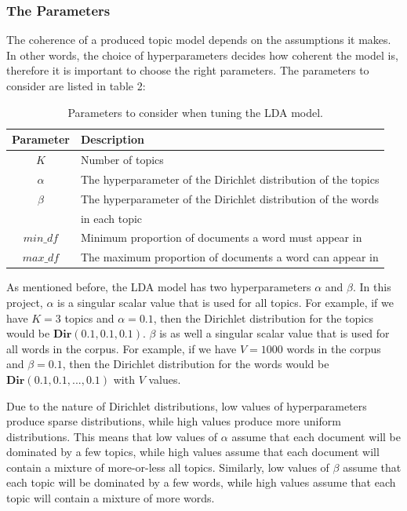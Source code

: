 \subsubsection*{The Parameters}

The coherence of a produced topic model depends on the assumptions it makes. In other words, the choice of hyperparameters decides how coherent the model is, therefore it is important to choose the right parameters. The parameters to consider are listed in table 2:

\begin{table}[h]
    \centering
    \begin{tabular}{cl}
        \hline
        Parameter & Description \\
        \hline
        $K$ & Number of topics \\
        $\alpha$ & The hyperparameter of the Dirichlet distribution of the topics\\
        $\beta$ & The hyperparameter of the Dirichlet distribution of the words  \\
          &  in each topic \\
        $min\_df$ & Minimum proportion of documents a word must appear in \\
        $max\_df$ & The maximum proportion of documents a word can appear in \\
\end{tabular}
    \caption{Parameters to consider when tuning the LDA model.}
    \label{tab:parameters}
\end{table}

As mentioned before, the LDA model has two hyperparameters $\alpha$ and $\beta$. In this project, $\alpha$ is a singular scalar value that is used for all topics. For example, if we have $K=3$ topics and $\alpha=0.1$, then the Dirichlet distribution for the topics would be $\textbf{Dir}(0.1, 0.1, 0.1)$. $\beta$ is as well a singular scalar value that is used for all words in the corpus. For example, if we have $V=1000$ words in the corpus and $\beta=0.1$, then the Dirichlet distribution for the words would be $\textbf{Dir}(0.1, 0.1, ..., 0.1)$ with $V$ values.

Due to the nature of Dirichlet distributions, low values of hyperparameters produce sparse distributions, while high values produce more uniform distributions. This means that low values of $\alpha$ assume that each document will be dominated by a few topics, while high values assume that each document will contain a mixture of more-or-less all topics. Similarly, low values of $\beta$ assume that each topic will be dominated by a few words, while high values assume that each topic will contain a mixture of more words.

